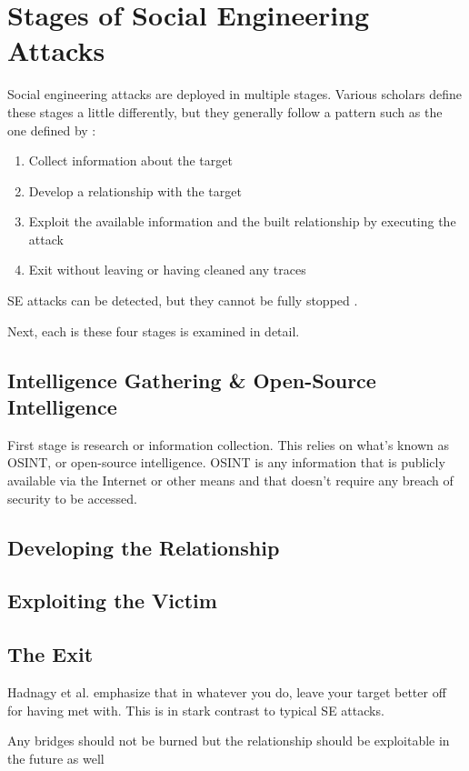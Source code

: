 \chapter{Stages of Social Engineering Attacks\label{stages}}

Social engineering attacks are deployed in multiple stages. Various scholars define these stages a little differently, but they generally follow a pattern such as the one defined by \cite{wang_defining_2020}:

\begin{enumerate}
    \item Collect information about the target
    \item Develop a relationship with the target
    \item Exploit the available information and the built relationship by executing the attack
    \item Exit without leaving or having cleaned any traces
\end{enumerate}

SE attacks can be detected, but they cannot be fully stopped \citep{wang_defining_2020}.

Next, each is these four stages is examined in detail.

\section{Intelligence Gathering \& Open-Source Intelligence}

First stage is research or information collection. This relies on what's known as OSINT, or open-source intelligence. OSINT is any information that is publicly available via the Internet or other means and that doesn't require any breach of security to be accessed.

\section{Developing the Relationship}

\section{Exploiting the Victim}

\section{The Exit}

Hadnagy et al. emphasize that in whatever you do, leave your target better off for having met with. This is in stark contrast to typical SE attacks.

Any bridges should not be burned but the relationship should be exploitable in the future as well